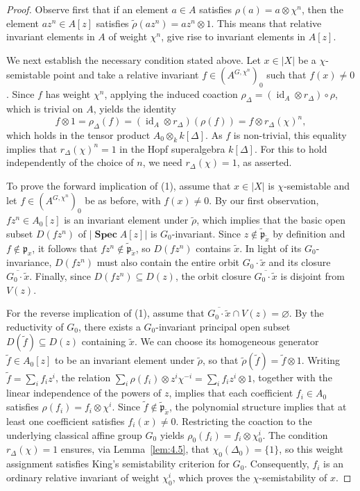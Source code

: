 \documentclass[11pt,a4paper,reqno,noamsfonts]{amsart}
\numberwithin{equation}{section}
\theoremstyle{definition}
\theoremstyle{remark}
\newcommand{\pfrak}{\ensuremath{\mathfrak{p}}}
\DeclareMathOperator{\id}{id}
\DeclareMathOperator{\sSpec}{\mathbf{Spec}}
\begin{document}
\begin{proof}
Observe first that if an element $a \in A$ satisfies $\rho(a) = a \otimes \chi^{n}$, then the element $az^{n} \in A[z]$ satisfies $\tilde{\rho}(az^{n}) = az^{n} \otimes 1$. This means that relative invariant elements in $A$ of weight $\chi^{n}$, give rise to invariant elements in $A[z]$.

We next establish the necessary condition stated above. Let $x \in \lvert X \rvert$ be a $\chi$-semistable point and take a relative invariant $f \in (A^{G,\chi^n})_0$ such that $f(x) \neq 0$. Since $f$ has weight $\chi^{n}$, applying the induced coaction $\rho_{\Delta} = (\id_A \otimes r_{\Delta}) \circ \rho$, which is trivial on $A$, yields the identity
$$
f \otimes 1 = \rho_{\Delta}(f) =  (\id_A \otimes r_{\Delta})(\rho(f)) = f \otimes r_{\Delta}(\chi)^n,
$$
which holds in the tensor product $A_0 \otimes_k k[\Delta]$. As $f$ is non-trivial, this equality implies that $r_{\Delta}(\chi)^n = 1$ in the Hopf superalgebra $k[\Delta]$. For this to hold independently of the choice of $n$, we need $r_{\Delta}(\chi) = 1$, as asserted. 

To prove the forward implication of (1), assume that $x \in \lvert X \rvert$ is $\chi$-semistable and let $f \in (A^{G,\chi^n})_0$ be as before, with $f(x) \neq 0$. By our first observation, $f z^n \in A_0[z]$ is an invariant element under $\tilde{\rho}$, which implies that the basic open subset $D(f z^n)$ of $\lvert \sSpec A[z] \rvert$ is $G_0$-invariant. Since $z \notin \tilde{\pfrak}_{\tilde{x}}$ by definition and $f \notin \pfrak_x$, it follows that $f z^n \notin \tilde{\pfrak}_{\tilde{x}}$, so $D(f z^n)$ contains $\tilde{x}$. In light of its $G_0$-invariance, $D(f z^n)$ must also contain the entire orbit $G_0 \cdot \tilde{x}$ and its closure $\overline{G_0 \cdot \tilde{x}}$. Finally, since $D(f z^n) \subseteq D(z)$, the orbit closure $\overline{G_{0}\cdot \tilde{x}}$ is disjoint from $V(z)$.

For the reverse implication of (1), assume that $\overline{G_0 \cdot \tilde{x}} \cap V(z) = \varnothing$. By the reductivity of $G_0$, there exists a $G_0$-invariant principal open subset $D(\tilde{f}) \subseteq D(z)$ containing $\tilde{x}$. We can choose its homogeneous generator $\tilde{f} \in A_0[z]$ to be an invariant element under $\tilde{\rho}$, so that $\tilde{\rho}(\tilde{f}) = \tilde{f} \otimes 1$. Writing $\tilde{f} = \sum_i f_i z^i$, the relation $\sum_i \rho(f_i) \otimes z^i \chi^{-i} = \sum_i f_i z^i \otimes 1$, together with the linear independence of the powers of $z$, implies that each coefficient $f_i \in A_0$ satisfies $\rho(f_i) = f_i \otimes \chi^i$. Since $\tilde{f} \notin \tilde{\pfrak}_{\tilde{x}}$, the polynomial structure implies that at least one coefficient satisfies $f_i(x) \neq 0$. Restricting the coaction to the underlying classical affine group $G_0$ yields $\rho_0(f_i) = f_i \otimes \chi_0^i$. The condition $r_{\Delta}(\chi) = 1$ ensures, via Lemma~\ref{lem:4.5}, that $\chi_0(\Delta_0) = \{ 1 \}$, so this weight assignment satisfies King's semistability criterion for $G_0$. Consequently, $f_i$ is an ordinary relative invariant of weight $\chi_0^i$, which proves the $\chi$-semistability of $x$.


\end{proof}
\end{document}
